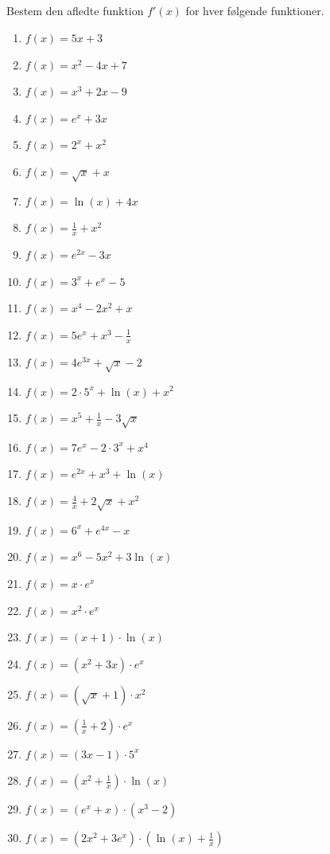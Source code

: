 \documentclass[10pt,a4paper,table]{article}
\begin{document}
\subsection{}
Bestem den afledte funktion $f'(x)$ for hver følgende funktioner.
\begin{enumerate}[label=\arabic*)]
  \item $f(x)=5x+3$
  \item $f(x)=x^2-4x+7$
  \item $f(x)=x^3+2x-9$
  \item $f(x)=e^x+3x$
  \item $f(x)=2^x+x^2$
  \item $f(x)=\sqrt{x}+x$
  \item $f(x)=\ln(x)+4x$
  \item $f(x)=\frac{1}{x}+x^2$
  \item $f(x)=e^{2x}-3x$
  \item $f(x)=3^x+e^x-5$
  \item $f(x)=x^4-2x^2+x$
  \item $f(x)=5e^x+x^3-\frac{1}{x}$
  \item $f(x)=4e^{3x}+\sqrt{x}-2$
  \item $f(x)=2\cdot 5^x+\ln(x)+x^2$
  \item $f(x)=x^5+\frac{1}{x}-3\sqrt{x}$
  \item $f(x)=7e^x-2\cdot 3^x+x^4$
  \item $f(x)=e^{2x}+x^3+\ln(x)$
  \item $f(x)=\frac{4}{x}+2\sqrt{x}+x^2$
  \item $f(x)=6^x+e^{4x}-x$
  \item $f(x)=x^6-5x^2+3\ln(x)$
  \item $f(x)=x\cdot e^x$
  \item $f(x)=x^2\cdot e^x$
  \item $f(x)=(x+1)\cdot \ln(x)$
  \item $f(x)=(x^2+3x)\cdot e^x$
  \item $f(x)=(\sqrt{x}+1)\cdot x^2$
  \item $f(x)=\left(\frac{1}{x}+2\right)\cdot e^x$
  \item $f(x)=(3x-1)\cdot 5^x$
  \item $f(x)=\left(x^2+\frac{1}{x}\right)\cdot \ln(x)$
  \item $f(x)=(e^x+x)\cdot (x^3-2)$
  \item $f(x)=(2x^2+3e^x)\cdot \left(\ln(x)+\frac{1}{x}\right)$
\end{enumerate}
\end{document}
